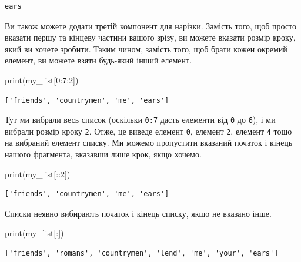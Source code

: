 \documentclass[
  letterpaper,
]{report}
\newenvironment{Shaded}{\begin{snugshade}}{\end{snugshade}}
\newcommand{\BuiltInTok}[1]{\textcolor[rgb]{0.00,0.23,0.31}{#1}}
\newcommand{\DecValTok}[1]{\textcolor[rgb]{0.68,0.00,0.00}{#1}}
\newcommand{\NormalTok}[1]{\textcolor[rgb]{0.00,0.23,0.31}{#1}}
\begin{document}
\begin{verbatim}
ears
\end{verbatim}

Ви також можете додати третій компонент для нарізки. Замість того, щоб
просто вказати першу та кінцеву частини вашого зрізу, ви можете вказати
розмір кроку, який ви хочете зробити. Таким чином, замість того, щоб
брати кожен окремий елемент, ви можете взяти будь-який інший елемент.

\begin{Shaded}
\begin{Highlighting}[]
\BuiltInTok{print}\NormalTok{(my\_list[}\DecValTok{0}\NormalTok{:}\DecValTok{7}\NormalTok{:}\DecValTok{2}\NormalTok{])}
\end{Highlighting}
\end{Shaded}

\begin{verbatim}
['friends', 'countrymen', 'me', 'ears']
\end{verbatim}

Тут ми вибрали весь список (оскільки \texttt{0:7} дасть елементи від
\texttt{0} до \texttt{6}), і ми вибрали розмір кроку \texttt{2}. Отже,
це виведе елемент \texttt{0}, елемент \texttt{2}, елемент \texttt{4}
тощо на вибраний елемент списку. Ми можемо пропустити вказаний початок і
кінець нашого фрагмента, вказавши лише крок, якщо хочемо.

\begin{Shaded}
\begin{Highlighting}[]
\BuiltInTok{print}\NormalTok{(my\_list[::}\DecValTok{2}\NormalTok{])}
\end{Highlighting}
\end{Shaded}

\begin{verbatim}
['friends', 'countrymen', 'me', 'ears']
\end{verbatim}

Списки неявно вибирають початок і кінець списку, якщо не вказано інше.

\begin{Shaded}
\begin{Highlighting}[]
\BuiltInTok{print}\NormalTok{(my\_list[:])}
\end{Highlighting}
\end{Shaded}

\begin{verbatim}
['friends', 'romans', 'countrymen', 'lend', 'me', 'your', 'ears']
\end{verbatim}
\end{document}
